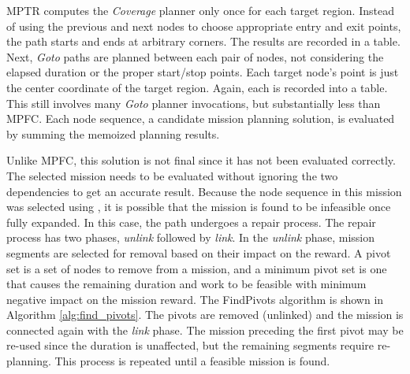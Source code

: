 \documentclass{tamuccthesis}
\begin{document}
MPTR computes the \textit{Coverage} planner only once for each target region. Instead of using the previous and next nodes to choose appropriate entry and exit points, the path starts and ends at arbitrary corners. The results are recorded in a table. Next, \textit{Goto} paths are planned between each pair of nodes, not considering the elapsed duration or the proper start/stop points. Each target node's point is just the center coordinate of the target region. Again, each is recorded into a table. This still involves many \textit{Goto} planner invocations, but substantially less than MPFC. Each node sequence, a candidate mission planning solution, is evaluated by summing the memoized planning results. 

Unlike MPFC, this solution is not final since it has not been evaluated correctly. The selected mission needs to be evaluated without ignoring the two dependencies to get an accurate result. Because the node sequence in this mission was selected using , it is possible that the mission is found to be infeasible once fully expanded. In this case, the path undergoes a repair process. The repair process has two phases, \textit{unlink} followed by \textit{link}. In the \textit{unlink} phase, mission segments are selected for removal based on their impact on the reward. A pivot set is a set of nodes to remove from a mission, and a minimum pivot set is one that causes the remaining duration and work to be feasible with minimum negative impact on the mission reward. The FindPivots algorithm is shown in Algorithm \ref{alg:find_pivots}. The pivots are removed (unlinked) and the mission is connected again with the \textit{link} phase. The mission preceding the first pivot may be re-used since the duration is unaffected, but the remaining segments require re-planning. This process is repeated until a feasible mission is found. 
\end{document}
